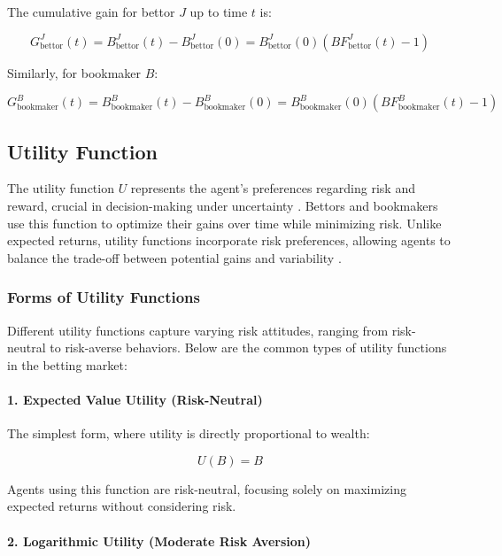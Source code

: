 The cumulative gain for bettor \( J \) up to time \( t \) is:

\[
G_{\text{bettor}}^J(t) = B_{\text{bettor}}^J(t) - B_{\text{bettor}}^J(0) = B_{\text{bettor}}^J(0) \left( BF_{\text{bettor}}^J(t) - 1 \right)
\]

Similarly, for bookmaker \( B \):

\[
G_{\text{bookmaker}}^B(t) = B_{\text{bookmaker}}^B(t) - B_{\text{bookmaker}}^B(0) = B_{\text{bookmaker}}^B(0) \left( BF_{\text{bookmaker}}^B(t) - 1 \right)
\]


\subsection{Utility Function}

The utility function \( U \) represents the agent's preferences regarding risk and reward, crucial in decision-making under uncertainty \cite{KahnemanTversky1979}. Bettors and bookmakers use this function to optimize their gains over time while minimizing risk. Unlike expected returns, utility functions incorporate risk preferences, allowing agents to balance the trade-off between potential gains and variability 
\cite{Markowitz1952} \cite{Arrow1971} \cite{Pratt1964}.

\subsubsection{Forms of Utility Functions}

Different utility functions capture varying risk attitudes, ranging from risk-neutral to risk-averse behaviors. Below are the common types of utility functions in the betting market:

\paragraph{1. Expected Value Utility (Risk-Neutral)}

The simplest form, where utility is directly proportional to wealth:

\[
U(B) = B
\]

Agents using this function are risk-neutral, focusing solely on maximizing expected returns without considering risk.

\paragraph{2. Logarithmic Utility (Moderate Risk Aversion)}

